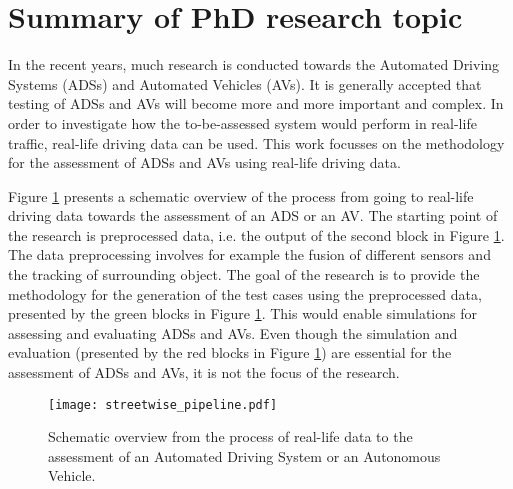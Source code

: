 \documentclass[10pt,final,a4paper,oneside,onecolumn]{article}
\begin{document}
\section*{Summary of PhD research topic}

In the recent years, much research is conducted towards the Automated Driving Systems (ADSs) and Automated Vehicles (AVs). It is generally accepted that testing of ADSs and AVs will become more and more important and complex. In order to investigate how the to-be-assessed system would perform in real-life traffic, real-life driving data can be used. This work focusses on the methodology for the assessment of ADSs and AVs using real-life driving data.

Figure \ref{fig:scheme} presents a schematic overview of the process from going to real-life driving data towards the assessment of an ADS or an AV. The starting point of the research is preprocessed data, i.e. the output of the second block in Figure \ref{fig:scheme}. The data preprocessing involves for example the fusion of different sensors and the tracking of surrounding object. The goal of the research is to provide the methodology for the generation of the test cases using the preprocessed data, presented by the green blocks in Figure \ref{fig:scheme}. This would enable simulations for assessing and evaluating ADSs and AVs. Even though the simulation and evaluation (presented by the red blocks in Figure \ref{fig:scheme}) are essential for the assessment of ADSs and AVs, it is not the focus of the research.

\begin{figure}[b]
	\begin{center}
		\texttt{[image: streetwise\_pipeline.pdf]}
		\caption{Schematic overview from the process of real-life data to the assessment of an Automated Driving System or an Autonomous Vehicle.}
		\label{fig:scheme}
	\end{center}
\end{figure}
\end{document}
